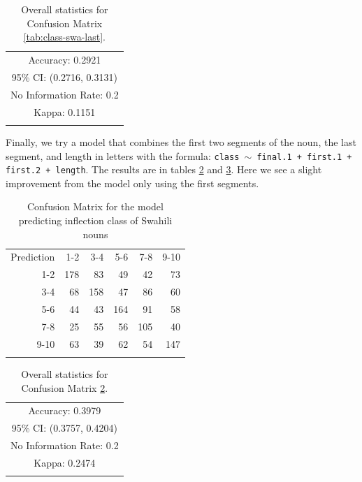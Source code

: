 \begin{table}[!htpb]
  \centering
  \begin{tabular}{lllrrr}
    \lsptoprule
    \multicolumn{6}{c}{Overall statistics:} \\
    \midrule
    \multicolumn{6}{c}{Accuracy: 0.2921}            \\
    \multicolumn{6}{c}{95\% CI: (0.2716, 0.3131)}   \\
    \multicolumn{6}{c}{No Information Rate: 0.2} \\
    \multicolumn{6}{c}{Kappa: 0.1151}               \\
    \lspbottomrule
  \end{tabular}
  \caption{Overall statistics for Confusion Matrix \ref{tab:class-swa-last}.}\label{tab:class-swa-last-stats}
\end{table}

Finally, we try a model that combines the first two segments of the noun, the last segment, and length in letters with the formula: \texttt{class $\sim$ final.1 + first.1 + first.2 + length}. The results are in tables \ref{tab:class-swa-last-first} and \ref{tab:class-swa-last-first-stats}. Here we see a slight improvement from the model only using the first segments.


\begin{table}[!htpb]
  \centering
  \begin{tabular}{rrrrrr}
    \lsptoprule
    \multicolumn{6}{c}{Reference}             \\
    \midrule
    Prediction & 1-2 & 3-4 & 5-6 & 7-8 & 9-10 \\
    1-2        & 178 & 83  & 49  & 42  & 73   \\
    3-4        & 68  & 158 & 47  & 86  & 60   \\
    5-6        & 44  & 43  & 164 & 91  & 58   \\
    7-8        & 25  & 55  & 56  & 105 & 40   \\
    9-10       & 63  & 39  & 62  & 54  & 147  \\
    \lspbottomrule
  \end{tabular}
  \caption{Confusion Matrix for the model predicting inflection class of Swahili nouns}\label{tab:class-swa-last-first}
\end{table}

\begin{table}[!htpb]
  \centering
  \begin{tabular}{lllrrr}
    \lsptoprule
    \multicolumn{6}{c}{Overall statistics:} \\
    \midrule
    \multicolumn{6}{c}{Accuracy: 0.3979}            \\
    \multicolumn{6}{c}{95\% CI: (0.3757, 0.4204)}   \\
    \multicolumn{6}{c}{No Information Rate: 0.2} \\
    \multicolumn{6}{c}{Kappa: 0.2474}               \\
    \lspbottomrule
  \end{tabular}
  \caption{Overall statistics for Confusion Matrix \ref{tab:class-swa-last-first}.}\label{tab:class-swa-last-first-stats}
\end{table}

